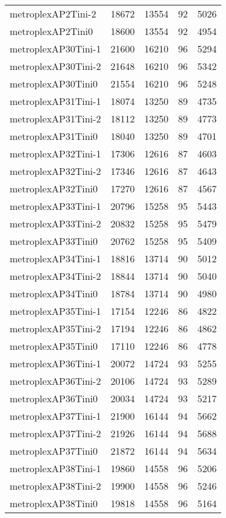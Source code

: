 \begin{tabular}{lrrrr}
metroplexAP2Tini-2 & 18672 & 13554 & 92 & 5026 \\
metroplexAP2Tini0 & 18600 & 13554 & 92 & 4954 \\
metroplexAP30Tini-1 & 21600 & 16210 & 96 & 5294 \\
metroplexAP30Tini-2 & 21648 & 16210 & 96 & 5342 \\
metroplexAP30Tini0 & 21554 & 16210 & 96 & 5248 \\
metroplexAP31Tini-1 & 18074 & 13250 & 89 & 4735 \\
metroplexAP31Tini-2 & 18112 & 13250 & 89 & 4773 \\
metroplexAP31Tini0 & 18040 & 13250 & 89 & 4701 \\
metroplexAP32Tini-1 & 17306 & 12616 & 87 & 4603 \\
metroplexAP32Tini-2 & 17346 & 12616 & 87 & 4643 \\
metroplexAP32Tini0 & 17270 & 12616 & 87 & 4567 \\
metroplexAP33Tini-1 & 20796 & 15258 & 95 & 5443 \\
metroplexAP33Tini-2 & 20832 & 15258 & 95 & 5479 \\
metroplexAP33Tini0 & 20762 & 15258 & 95 & 5409 \\
metroplexAP34Tini-1 & 18816 & 13714 & 90 & 5012 \\
metroplexAP34Tini-2 & 18844 & 13714 & 90 & 5040 \\
metroplexAP34Tini0 & 18784 & 13714 & 90 & 4980 \\
metroplexAP35Tini-1 & 17154 & 12246 & 86 & 4822 \\
metroplexAP35Tini-2 & 17194 & 12246 & 86 & 4862 \\
metroplexAP35Tini0 & 17110 & 12246 & 86 & 4778 \\
metroplexAP36Tini-1 & 20072 & 14724 & 93 & 5255 \\
metroplexAP36Tini-2 & 20106 & 14724 & 93 & 5289 \\
metroplexAP36Tini0 & 20034 & 14724 & 93 & 5217 \\
metroplexAP37Tini-1 & 21900 & 16144 & 94 & 5662 \\
metroplexAP37Tini-2 & 21926 & 16144 & 94 & 5688 \\
metroplexAP37Tini0 & 21872 & 16144 & 94 & 5634 \\
metroplexAP38Tini-1 & 19860 & 14558 & 96 & 5206 \\
metroplexAP38Tini-2 & 19900 & 14558 & 96 & 5246 \\
metroplexAP38Tini0 & 19818 & 14558 & 96 & 5164 \\

\end{tabular}
